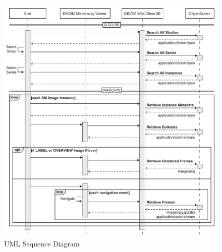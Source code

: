 \documentclass[12pt, letterpaper]{article}
\begin{document}
\begin{figure}[h!]
  \includegraphics[width=\textwidth]{./figures/uml-sequence-diagram.pdf}
  \caption{\gls{UML} Sequence Diagram}
  \label{figure:2}
\end{figure}
\end{document}

